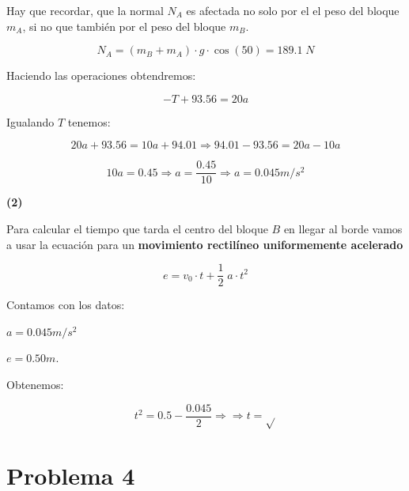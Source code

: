 \documentclass[a4paper,12pt]{article} %
\begin{document}
\begin{justify}
    Hay que recordar, que la normal \(N_A\) es afectada no solo por el el peso del bloque \(m_A\), si no que también por el peso del bloque \(m_B.\)
\end{justify}

\[N_A = \left(m_B + m_A\right) \cdot g \cdot \cos (50) = 189.1\;N\]

\begin{justify}
    Haciendo las operaciones obtendremos:
\end{justify}

\[-T + 93.56 = 20a\]

\begin{justify}
    Igualando \(T\) tenemos:
\end{justify}

\[20a + 93.56 = 10a + 94.01 \Longrightarrow 94.01 - 93.56 = 20a - 10a\]

\[10a = 0.45 \Longrightarrow  a = \frac{0.45}{10} \Longrightarrow \boxed{a = 0.045 m/s^2}\]


\begin{justify}
    \textbf{(2)}
\end{justify}

\begin{justify}
    Para calcular el tiempo que tarda el centro del bloque \(B\) en llegar al borde vamos a usar la ecuación para un \textbf{movimiento rectilíneo uniformemente acelerado}  
\end{justify}
\[e = v_0 \cdot t + \frac{1}{2} \; a \cdot t^2\]
\begin{justify}
    Contamos con los datos:
\end{justify}

\begin{multicols}{2}
    \(a = 0.045 m/s^2\)
    
    \(e = 0.50 m.\)
\end{multicols}

\begin{justify}
    Obtenemos:
\end{justify}

\[t^2 = 0.5 - \frac{0.045}{2} \Longrightarrow \Longrightarrow t = \sqrt{} \]

\newpage

\section*{Problema 4}
\end{document}
